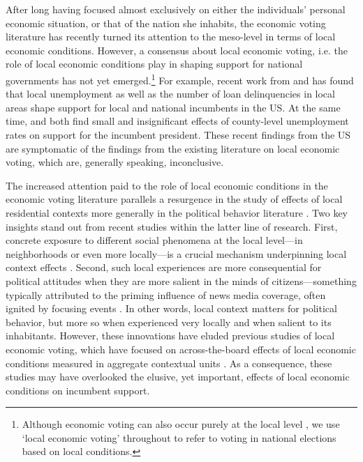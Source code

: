 \documentclass[12pt,a4paper]{article}
\begin{document}
	After long having focused almost exclusively on either the individuals’ personal economic situation, or that of the nation she inhabits, the economic voting literature has recently turned its attention to the meso-level in terms of local economic conditions. However, a consensus about local economic voting, i.e. the role of local economic conditions play in shaping support for national governments has not yet emerged.\footnote{Although economic voting can also occur purely at the local level \cite[cf.][]{hopkins2017retrospective, burnett2017politics}, we use `local economic voting’ throughout to refer to voting in national elections based on local conditions.} For example, recent work from \cite{hansford2015reevaluating} and \cite{healy2017presidential} has found that local unemployment as well as the number of loan delinquencies in local areas shape support for local and national incumbents in the US. At the same time, \cite{hill2010economic} and \cite{wright2012unemployment} both find small and insignificant effects of county-level unemployment rates on support for the incumbent president. These recent findings from the US are symptomatic of the findings from the existing literature on local economic voting, which are, generally speaking, inconclusive.
	
	The increased attention paid to the role of local economic conditions in the economic voting literature parallels a resurgence in the study of effects of local residential contexts more generally in the political behavior literature \cite[e.g.,][]{hopkins2010politicized,enos2016demolition}. Two key insights stand out from recent studies within the latter line of research. First, concrete exposure to different social phenomena at the local level—in neighborhoods or even more locally—is a crucial mechanism underpinning local context effects \citep{moore2017defining,dinesen2015ethnic,enos2016demolition,hjorth2017influence}. Second, such local experiences are more consequential for political attitudes when they are more salient in the minds of citizens—something typically attributed to the priming influence of news media coverage, often ignited by focusing events \citep{hopkins2010politicized,legewie2013terrorist, davenport2015policy}. In other words, local context matters for political behavior, but more so when experienced very locally and when salient to its inhabitants. However, these innovations have eluded previous studies of local economic voting, which have focused on across-the-board effects of local economic conditions measured in aggregate contextual units \citep[though see][]{bisgaard2016reconsidering,healy2017presidential}. As a consequence, these studies may have overlooked the elusive, yet important, effects of local economic conditions on incumbent support. 
	
\end{document}
